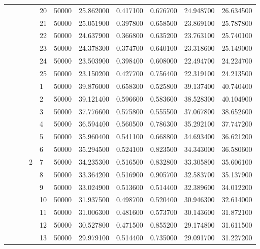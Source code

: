 \begin{tabular}{llllllrrrrr}
\cline{5-11}
 &  &  &  & 20 & 50000 & 25.862000 & 0.417100 & 0.676700 & 24.948700 & 26.634500 \\
\cline{5-11}
 &  &  &  & 21 & 50000 & 25.051900 & 0.397800 & 0.658500 & 23.869100 & 25.787800 \\
\cline{5-11}
 &  &  &  & 22 & 50000 & 24.637900 & 0.366800 & 0.635200 & 23.763100 & 25.740100 \\
\cline{5-11}
 &  &  &  & 23 & 50000 & 24.378300 & 0.374700 & 0.640100 & 23.318600 & 25.149000 \\
\cline{5-11}
 &  &  &  & 24 & 50000 & 23.503900 & 0.398400 & 0.608000 & 22.494700 & 24.224700 \\
\cline{5-11}
 &  &  &  & 25 & 50000 & 23.150200 & 0.427700 & 0.756400 & 22.319100 & 24.213500 \\
\cline{4-11} \cline{5-11}
 &  &  & \multirow[t]{24}{*}{2} & 1 & 50000 & 39.876000 & 0.658300 & 0.525800 & 39.137400 & 40.740400 \\
\cline{5-11}
 &  &  &  & 2 & 50000 & 39.121400 & 0.596600 & 0.583600 & 38.528300 & 40.104900 \\
\cline{5-11}
 &  &  &  & 3 & 50000 & 37.776600 & 0.575800 & 0.555500 & 37.067800 & 38.652600 \\
\cline{5-11}
 &  &  &  & 4 & 50000 & 36.594400 & 0.560500 & 0.786300 & 35.292100 & 37.747200 \\
\cline{5-11}
 &  &  &  & 5 & 50000 & 35.960400 & 0.541100 & 0.668800 & 34.693400 & 36.621200 \\
\cline{5-11}
 &  &  &  & 6 & 50000 & 35.294500 & 0.524100 & 0.823500 & 34.343000 & 36.580600 \\
\cline{5-11}
 &  &  &  & 7 & 50000 & 34.235300 & 0.516500 & 0.832800 & 33.305800 & 35.606100 \\
\cline{5-11}
 &  &  &  & 8 & 50000 & 33.364200 & 0.516900 & 0.905700 & 32.583700 & 35.137900 \\
\cline{5-11}
 &  &  &  & 9 & 50000 & 33.024900 & 0.513600 & 0.514400 & 32.389600 & 34.012200 \\
\cline{5-11}
 &  &  &  & 10 & 50000 & 31.937500 & 0.498700 & 0.520400 & 30.946300 & 32.614000 \\
\cline{5-11}
 &  &  &  & 11 & 50000 & 31.006300 & 0.481600 & 0.573700 & 30.143600 & 31.872100 \\
\cline{5-11}
 &  &  &  & 12 & 50000 & 30.527800 & 0.471500 & 0.855200 & 29.174800 & 31.611500 \\
\cline{5-11}
 &  &  &  & 13 & 50000 & 29.979100 & 0.514400 & 0.735000 & 29.091700 & 31.227200 \\

\end{tabular}
